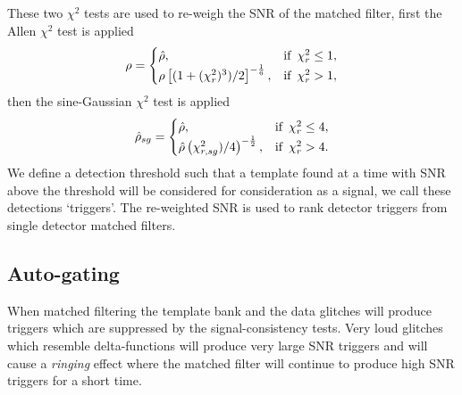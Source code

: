 These two $\chi^{2}$ tests are used to re-weigh the SNR of the matched filter, first the Allen $\chi^{2}$ test is applied~\cite{McIsaac_Chi:2022}
%
\begin{equation}
    \rho =
    \begin{cases}
        \hat{\rho}, & \text{if \,} \chi^{2}_{r} \le 1, \\
        \rho\left[(1 + (\chi^{2}_{r})^{3}) /2\right]^{-\frac{1}{6}}, & \text{if \,} \chi^{2}_{r} > 1,
    \end{cases}
\end{equation}
%
then the sine-Gaussian $\chi^{2}$ test is applied
%
\begin{equation}
    \hat{\rho}_{sg} =
    \begin{cases}
        \hat{\rho}, & \text{if \,} \chi^{2}_{r} \le 4, \\
        \hat{\rho}\left(\chi^{2}_{r, sg})/4\right)^{-\frac{1}{2}}, & \text{if \,} \chi^{2}_{r} > 4.
    \end{cases}
\end{equation}
%
We define a detection threshold such that a template found at a time with SNR above the threshold will be considered for consideration as a \gwadj signal, we call these detections `triggers'. The re-weighted SNR is used to rank detector triggers from single detector matched filters.

\subsection{\label{2:sec:auto-gating}Auto-gating}

When matched filtering the template bank and the data glitches will produce triggers which are suppressed by the signal-consistency tests. Very loud glitches which resemble delta-functions will produce very large SNR triggers and will cause a \textit{ringing} effect where the matched filter will continue to produce high SNR triggers for a short time.

